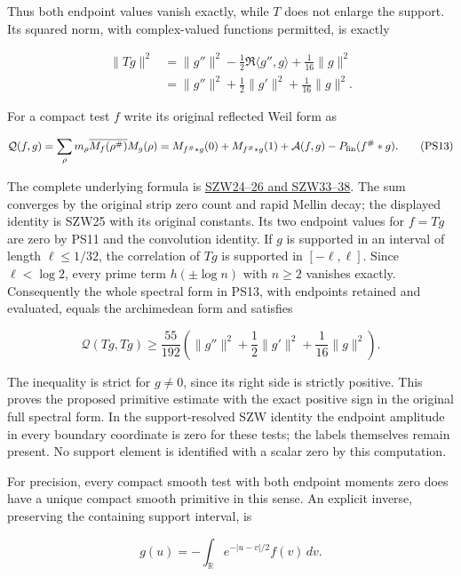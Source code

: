 \documentclass[
  10pt,
  a4paper,
]{article}
\begin{document}
Thus both endpoint values vanish exactly, while \(T\) does not enlarge
the support. Its squared norm, with complex-valued functions permitted,
is exactly

\[
\begin{aligned}
\|Tg\|^2
&=\|g''\|^2-\frac12\Re\langle g'',g\rangle
+\frac1{16}\|g\|^2\\
&=\|g''\|^2+\frac12\|g'\|^2+\frac1{16}\|g\|^2.
\end{aligned}
\tag{PS12}
\]

For a compact test \(f\) write its original reflected Weil form as

\[
\mathcal Q(f,g)=\sum_\rho m_\rho
\overline{M_f(\rho^\#)}M_g(\rho)
=M_{f^\#*g}(0)+M_{f^\#*g}(1)
+\mathcal A(f,g)-P_{\rm fin}(f^\#*g).
\tag{PS13}
\]

The complete underlying formula is
\href{https://github.com/KokunoYumeto/zeta-function-research-reader/blob/76f421965914beb133df797835f940849844dc4f/workbenches/splitzero-tandem/branches/tau-zero-prime-positivity/SUPPORTED_ZERO_PRIME_WEIL_DERIVATION.md}{SZW24--26
and SZW33--38}. The sum converges by the original strip zero count and
rapid Mellin decay; the displayed identity is SZW25 with its original
constants. Its two endpoint values for \(f=Tg\) are zero by PS11 and the
convolution identity. If \(g\) is supported in an interval of length
\(\ell\le1/32\), the correlation of \(Tg\) is supported in
\([-\ell,\ell]\). Since \(\ell<\log2\), every prime term
\(h(\pm\log n)\) with \(n\ge2\) vanishes exactly. Consequently the whole
spectral form in PS13, with endpoints retained and evaluated, equals the
archimedean form and satisfies

\[
\boxed{\mathcal Q(Tg,Tg)\ge\frac{55}{192}
\left(\|g''\|^2+\frac12\|g'\|^2
+\frac1{16}\|g\|^2\right).}
\tag{PS14}
\]

The inequality is strict for \(g\ne0\), since its right side is strictly
positive. This proves the proposed primitive estimate with the exact
positive sign in the original full spectral form. In the
support-resolved SZW identity the endpoint amplitude in every boundary
coordinate is zero for these tests; the labels themselves remain
present. No support element is identified with a scalar zero by this
computation.

For precision, every compact smooth test with both endpoint moments zero
does have a unique compact smooth primitive in this sense. An explicit
inverse, preserving the containing support interval, is

\[
g(u)=-\int_{\mathbb R}e^{-|u-v|/2}f(v)\,dv.
\tag{PS15}
\]
\end{document}
